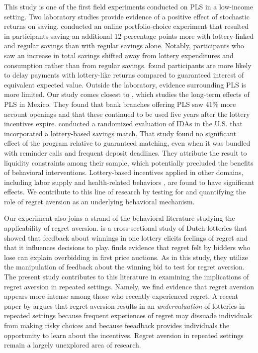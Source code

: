\documentclass[11pt]{article}
\begin{document}
	This study is one of the first field experiments conducted on PLS in a low-income setting. Two laboratory studies provide evidence of a positive effect of stochastic returns on saving. \textcite{atalay_savings_2014} conducted an online portfolio-choice experiment that resulted in participants saving an additional 12 percentage points more with lottery-linked and regular savings than with regular savings alone. Notably, participants who saw an increase in total savings shifted away from lottery expenditures and consumption rather than from regular savings. \textcite{filiz-ozbay_lottery_2015} found participants are more likely to delay payments with lottery-like returns compared to guaranteed interest of equivalent expected value. Outside the laboratory, evidence surrounding PLS is more limited. Our study comes closest to \textcite{gertler_long-term_2017}, which studies the long-term effects of PLS in Mexico. They found that bank branches offering PLS saw 41\% more account openings and that these continued to be used five years after the lottery incentives expire. \textcite{loibl_testing_2016} conducted a randomized evaluation of IDAs in the U.S. that incorporated a lottery-based savings match. That study found no significant effect of the program relative to guaranteed matching, even when it was bundled with reminder calls and frequent deposit deadlines. They attribute the result to liquidity constraints among their sample, which potentially precluded the benefits of behavioral interventions. Lottery-based incentives applied in other domains, including labor supply \parencite{brune_effect_2015} and health-related behaviors \parencite{kimmel_randomized_2012,bjorkman_nyqvist_using_2015}, are found to have significant effects. We contribute to this line of research by testing for and quantifying the role of regret aversion as an underlying behavioral mechanism.

	Our experiment also joins a strand of the behavioral literature studying the applicability of regret aversion. \parencite{zeelenberg_consequences_2004} is a cross-sectional study of Dutch lotteries that showed that feedback about winnings in one lottery elicits feelings of regret and that it influences decisions to play.  \parencite{filiz-ozbay_auctions_2007} finds evidence that regret felt by bidders who lose can explain overbidding in first price auctions. As in this study, they utilize the manipulation of feedback about the winning bid to test for regret aversion. The present study contributes to this literature in examining the implications of regret aversion in repeated settings. Namely, we find evidence that regret aversion appears more intense among those who recently experienced regret. A recent paper by \textcite{imas_regret_2016} argues that regret aversion results in an \emph{undervaluation} of lotteries in repeated settings because frequent experiences of regret may dissuade individuals from making risky choices and because feeadback provides individuals the opportunity to learn about the incentives. Regret aversion in repeated settings remain a largely unexplored area of research.
\end{document}

